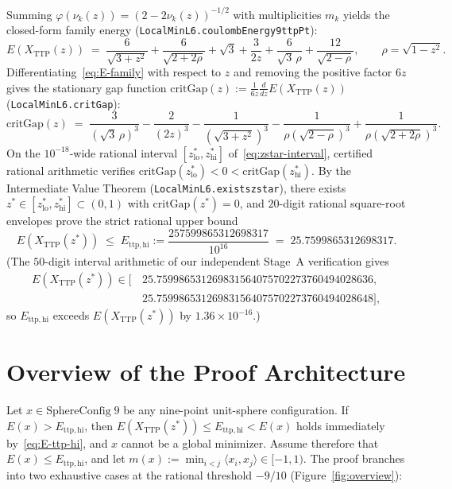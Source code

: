 \documentclass[11pt,reqno]{amsart}
\renewcommand{\_}{\origunderscore\allowbreak}
\theoremstyle{definition}
\newcommand{\ip}[2]{\langle #1, #2 \rangle}
\newcommand{\TTP}{X_{\mathrm{TTP}}}
\newcommand{\Ettphi}{E_{\mathrm{ttp,hi}}}
\begin{document}
Summing $\varphi(\nu_k(z)) = (2 - 2\nu_k(z))^{-1/2}$ with multiplicities $m_k$ yields the closed-form family energy (\texttt{LocalMinL6.coulombEnergy9\_ttpPt}):
\begin{equation}\label{eq:E-family}
  E(\TTP(z)) \;=\; \frac{6}{\sqrt{3+z^2}} + \frac{6}{\sqrt{2+2\rho}} + \sqrt{3} + \frac{3}{2z} + \frac{6}{\sqrt{3}\,\rho} + \frac{12}{\sqrt{2-\rho}},
  \qquad \rho = \sqrt{1-z^2}.
\end{equation}
Differentiating~\eqref{eq:E-family} with respect to $z$ and removing the positive factor $6z$ gives the stationary gap function $\mathrm{critGap}(z) := \frac{1}{6z}\frac{d}{dz}E(\TTP(z))$ (\texttt{LocalMinL6.critGap}):
\begin{equation}\label{eq:crit-gap}
  \mathrm{critGap}(z)
  \;=\; \frac{3}{(\sqrt{3}\,\rho)^3} - \frac{2}{(2z)^3} - \frac{1}{(\sqrt{3+z^2})^3} - \frac{1}{\rho(\sqrt{2-\rho})^3} + \frac{1}{\rho(\sqrt{2+2\rho})^3}.
\end{equation}
On the $10^{-18}$-wide rational interval $[z^*_{\mathrm{lo}}, z^*_{\mathrm{hi}}]$ of~\eqref{eq:zstar-interval}, certified rational arithmetic verifies $\mathrm{critGap}(z^*_{\mathrm{lo}}) < 0 < \mathrm{critGap}(z^*_{\mathrm{hi}})$. By the Intermediate Value Theorem (\texttt{LocalMinL6.exists\_z\_star}), there exists $z^* \in [z^*_{\mathrm{lo}}, z^*_{\mathrm{hi}}] \subset (0,1)$ with $\mathrm{critGap}(z^*) = 0$, and $20$-digit rational square-root envelopes prove the strict rational upper bound
\begin{equation}\label{eq:E-ttp-hi}
  E(\TTP(z^*)) \;\le\; \Ettphi := \frac{257599865312698317}{10^{16}} \;=\; 25.7599865312698317.
\end{equation}
(The $50$-digit interval arithmetic of our independent Stage~A verification gives
\[
  \begin{aligned}
  E(\TTP(z^*)) \in [&\,25.759986531269831564075702273760494028636, \\
                    &\,25.759986531269831564075702273760494028648],
  \end{aligned}
\]
so $\Ettphi$ exceeds $E(\TTP(z^*))$ by $1.36 \times 10^{-16}$.)

\section{Overview of the Proof Architecture}\label{sec:overview}

Let $x \in \mathrm{SphereConfig}\;9$ be any nine-point unit-sphere configuration.
If $E(x) > \Ettphi$, then $E(\TTP(z^*)) \le \Ettphi < E(x)$ holds immediately by~\eqref{eq:E-ttp-hi}, and $x$ cannot be a global minimizer.
Assume therefore that $E(x) \le \Ettphi$, and let $m(x) := \min_{i < j} \ip{x_i}{x_j} \in [-1, 1)$.
The proof branches into two exhaustive cases at the rational threshold $-9/10$ (Figure~\ref{fig:overview}):
\end{document}
